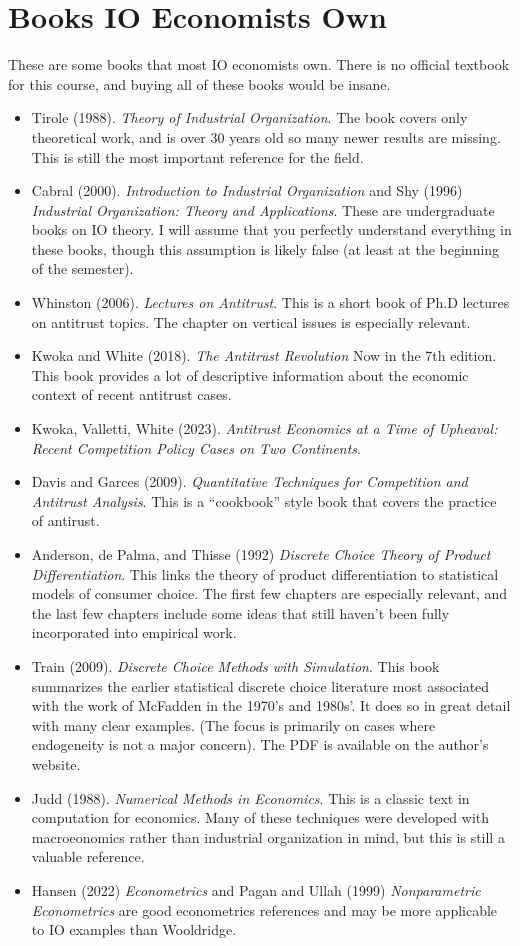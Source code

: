 \documentclass[11pt]{article}
\begin{document}
\section*{Books IO Economists Own}
These are some books that most IO economists own. There is no official textbook for this course, and buying all of these books would be insane.
\begin{itemize}
\item Tirole (1988). \textit{Theory of Industrial Organization}. The book covers only theoretical work, and is over 30 years old so many newer results are missing. This is still the most important reference for the field.
\item Cabral (2000). \textit{Introduction to Industrial Organization} and Shy (1996) \textit{Industrial Organization: Theory and Applications}. These are undergraduate books on IO theory. I will assume that you perfectly understand everything in these books, though this assumption is likely false (at least at the beginning of the semester).
\item Whinston (2006). \textit{Lectures on Antitrust}. This is a short book of Ph.D lectures on antitrust topics. The chapter on vertical issues is especially relevant.
\item Kwoka and White (2018). \textit{The Antitrust Revolution} Now in the 7th edition. This book provides a lot of descriptive information about the economic context of recent antitrust cases.
\item Kwoka, Valletti, White (2023). \textit{Antitrust Economics at a Time of Upheaval: Recent Competition Policy Cases on Two Continents}. 
\item Davis and Garces (2009). \textit{Quantitative Techniques for Competition and Antitrust Analysis}. This is a ``cookbook'' style book that covers the practice of antirust.
\item Anderson, de Palma, and Thisse (1992) \textit{Discrete Choice Theory of Product Differentiation}. This links the theory of product differentiation to statistical models of consumer choice. The first few chapters are especially relevant, and the last few chapters include some ideas that still haven't been fully incorporated into empirical work.
\item Train (2009). \textit{Discrete Choice Methods with Simulation}. This book summarizes the earlier statistical discrete choice literature most associated with the work of McFadden in the 1970's and 1980s'. It does so in great detail with many clear examples. (The focus is primarily on cases where endogeneity is not a major concern). The PDF is available on the author's website.
\item Judd (1988). \textit{Numerical Methods in Economics}. This is a classic text in computation for economics. Many of these techniques were developed with macroeonomics rather than industrial organization in mind, but this is still a valuable reference.
\item Hansen (2022) \textit{Econometrics} and Pagan and Ullah (1999) \textit{Nonparametric Econometrics} are good econometrics references and may be more applicable to IO examples than Wooldridge.

\end{itemize} 
\end{document}
